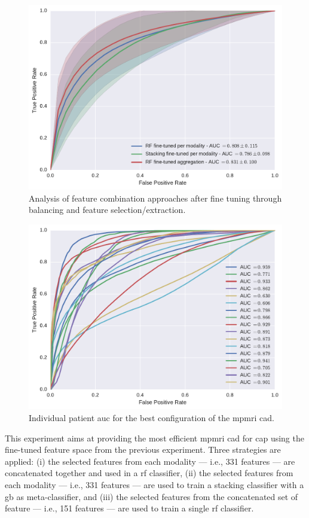 \begin{figure}
  \centering
  \includegraphics[width=0.7\linewidth]{6_pipeline/figures/exp-5/combine_all.pdf}
  \caption[Analysis of feature combination approaches after fine tuning.]{Analysis of feature combination approaches after fine tuning through balancing and feature selection/extraction.}
  \label{fig:res-Ex4}
\end{figure}

\begin{figure}
  \centering
  \includegraphics[width=0.7\linewidth]{6_pipeline/figures/exp-5/plot_all_patients.pdf}
  \caption{Individual patient \acs*{auc} for the best configuration of the \acs*{mpmri} \acs*{cad}.}
  \label{fig:indauc}
\end{figure}

This experiment aims at providing the most efficient \ac{mpmri} \ac{cad} for \ac{cap} using the fine-tuned feature space from the previous experiment.
Three strategies are applied:
(i) the selected features from each modality --- i.e., 331 features --- are concatenated together and used in a \ac{rf} classifier,
(ii) the selected features from each modality --- i.e., 331 features --- are used to train a stacking classifier with a \ac{gb} as meta-classifier, and
(iii) the selected features from the concatenated set of feature --- i.e., 151 features --- are used to train a single \ac{rf} classifier.

